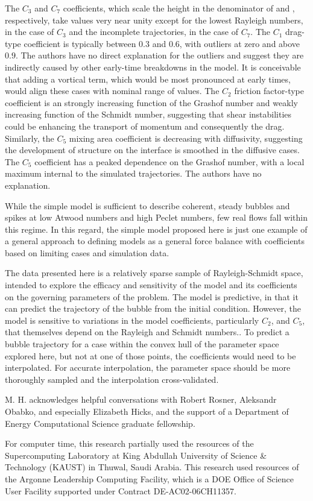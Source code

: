 The $C_3$ and $C_7$ coefficients, which scale the height in the denominator of  and , respectively, take values very near unity except for the lowest Rayleigh numbers, in the case of $C_3$ and the incomplete trajectories, in the case of $C_7$.
The $C_1$ drag-type coefficient is typically between $0.3$ and $0.6$, with outliers at zero and above $0.9$.
The authors have no direct explanation for the outliers and suggest they are indirectly caused by other early-time breakdowns in the model.
It is conceivable that adding a vortical term, which would be most pronounced at early times, would align these cases with nominal range of values.
The $C_2$ friction factor-type coefficient is an strongly increasing function of the Grashof number and weakly increasing function of the Schmidt number, suggesting that shear instabilities could be enhancing the transport of momentum and consequently the drag.
Similarly, the $C_5$ mixing area coefficient is decreasing with diffusivity, suggesting the development of structure on the interface is smoothed in the diffusive cases.
The $C_5$ coefficient has a peaked dependence on the Grashof number, with a local maximum internal to the simulated trajectories.
The authors have no explanation.

While the simple model is sufficient to describe coherent, steady bubbles and spikes at low Atwood numbers and high Peclet numbers, few real flows fall within this regime.
In this regard, the simple model proposed here is just one example of a general approach to defining models as a general force balance with coefficients based on limiting cases and simulation data.

The data presented here is a relatively sparse sample of Rayleigh-Schmidt space, intended to explore the efficacy and sensitivity of the model and its coefficients on the governing parameters of the problem.
The model is predictive, in that it can predict the trajectory of the bubble from the initial condition.
However, the model is sensitive to variations in the model coefficients, particularly $C_2$, and $C_5$, that themselves depend on the Rayleigh and Schmidt numbers..
To predict a bubble trajectory for a case within the convex hull of the parameter space explored here, but not at one of those points, the coefficients would need to be interpolated.
For accurate interpolation, the parameter space should be more thoroughly sampled and the interpolation cross-validated.

\begin{acknowledgements}
M. H. acknowledges helpful conversations with Robert Rosner, Aleksandr Obabko, and especially Elizabeth Hicks, and the support of a Department of Energy Computational Science graduate fellowship.

For computer time, this research partially used the resources of the
Supercomputing Laboratory at King Abdullah University of Science \& Technology
 (KAUST) in Thuwal, Saudi Arabia.
This research used resources of the Argonne Leadership Computing Facility, which
is a DOE Office of Science User Facility supported under Contract DE-AC02-06CH11357.
\end{acknowledgements}
